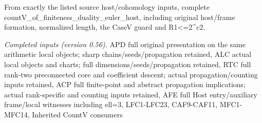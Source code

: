 \documentclass[11pt,a4paper]{article}
\numberwithin{equation}{section}
\theoremstyle{remark}\newtheorem{remark}[theorem]{Remark}
\begin{document}
From exactly the listed source host/cohomology inputs, complete countV\_\allowbreak of\_\allowbreak finiteness\_\allowbreak duality\_\allowbreak euler\_\allowbreak host, including original host/frame formation, normalized length, the CaseV guard and R1<=2\textasciicircum{}c2.

\emph{Completed inputs (version 0.56).} APD full original presentation on the same arithmetic local objects; sharp chains/seeds/propagation retained, ALC actual local objects and charts; full dimensions/seeds/propagation retained, RTC full rank-two preconnected core and coefficient descent; actual propagation/counting inputs retained, ACP full finite-point and abstract propagation implications; actual rank-specific and counting inputs retained, AFE full Host entry/auxiliary frame/local witnesses including ell=3, LFC1-LFC23, CAF9-CAF11, MFC1-MFC14, Inherited CountV consumers
\end{document}
